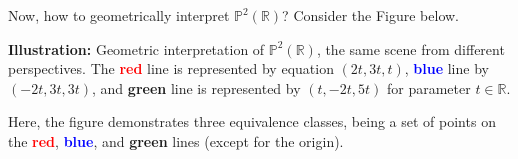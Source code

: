 \documentclass[../lecture-notes.tex]{subfiles}
\begin{document}
\begin{example}
    Now, how to geometrically interpret $\mathbb{P}^2(\mathbb{R})$? Consider the Figure below.

    \begin{center}
        {\textbf{Illustration:} Geometric interpretation of $\mathbb{P}^2(\mathbb{R})$, the same scene from different perspectives. The \textcolor{red}{\textbf{red}} line is represented by equation $(2t,3t,t)$, \textcolor{blue}{\textbf{blue}} line by $(-2t,3t,3t)$, and \textcolor{green!60!black}{\textbf{green}} line is represented by $(t,-2t,5t)$ for parameter $t \in \mathbb{R}$.}
    \end{center}

    Here, the figure demonstrates three equivalence classes, being a set of points on the \textcolor{red}{\textbf{red}}, \textcolor{blue}{\textbf{blue}}, and \textcolor{green!60!black}{\textbf{green}} lines (except for the origin). 
    

\end{example}
\end{document}
